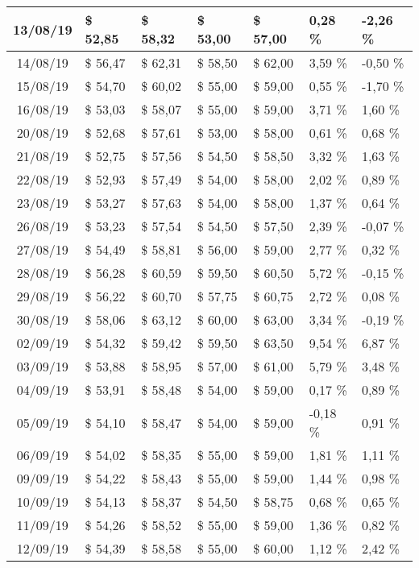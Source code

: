 \begin{center}
\begin{longtable}{|c|p{1.5cm}|p{1.5cm}|p{1.5cm}|p{1.5cm}|p{1.5cm}|p{1.5cm}|}
13/08/19 & \$ 52,85 & \$ 58,32 & \$ 53,00 & \$ 57,00 & 0,28 \% & -2,26 \% \\ \hline
14/08/19 & \$ 56,47 & \$ 62,31 & \$ 58,50 & \$ 62,00 & 3,59 \% & -0,50 \% \\ \hline
15/08/19 & \$ 54,70 & \$ 60,02 & \$ 55,00 & \$ 59,00 & 0,55 \% & -1,70 \% \\ \hline
16/08/19 & \$ 53,03 & \$ 58,07 & \$ 55,00 & \$ 59,00 & 3,71 \% & 1,60 \% \\ \hline
20/08/19 & \$ 52,68 & \$ 57,61 & \$ 53,00 & \$ 58,00 & 0,61 \% & 0,68 \% \\ \hline
21/08/19 & \$ 52,75 & \$ 57,56 & \$ 54,50 & \$ 58,50 & 3,32 \% & 1,63 \% \\ \hline
22/08/19 & \$ 52,93 & \$ 57,49 & \$ 54,00 & \$ 58,00 & 2,02 \% & 0,89 \% \\ \hline
23/08/19 & \$ 53,27 & \$ 57,63 & \$ 54,00 & \$ 58,00 & 1,37 \% & 0,64 \% \\ \hline
26/08/19 & \$ 53,23 & \$ 57,54 & \$ 54,50 & \$ 57,50 & 2,39 \% & -0,07 \% \\ \hline
27/08/19 & \$ 54,49 & \$ 58,81 & \$ 56,00 & \$ 59,00 & 2,77 \% & 0,32 \% \\ \hline
28/08/19 & \$ 56,28 & \$ 60,59 & \$ 59,50 & \$ 60,50 & 5,72 \% & -0,15 \% \\ \hline
29/08/19 & \$ 56,22 & \$ 60,70 & \$ 57,75 & \$ 60,75 & 2,72 \% & 0,08 \% \\ \hline
30/08/19 & \$ 58,06 & \$ 63,12 & \$ 60,00 & \$ 63,00 & 3,34 \% & -0,19 \% \\ \hline
02/09/19 & \$ 54,32 & \$ 59,42 & \$ 59,50 & \$ 63,50 & 9,54 \% & 6,87 \% \\ \hline
03/09/19 & \$ 53,88 & \$ 58,95 & \$ 57,00 & \$ 61,00 & 5,79 \% & 3,48 \% \\ \hline
04/09/19 & \$ 53,91 & \$ 58,48 & \$ 54,00 & \$ 59,00 & 0,17 \% & 0,89 \% \\ \hline
05/09/19 & \$ 54,10 & \$ 58,47 & \$ 54,00 & \$ 59,00 & -0,18 \% & 0,91 \% \\ \hline
06/09/19 & \$ 54,02 & \$ 58,35 & \$ 55,00 & \$ 59,00 & 1,81 \% & 1,11 \% \\ \hline
09/09/19 & \$ 54,22 & \$ 58,43 & \$ 55,00 & \$ 59,00 & 1,44 \% & 0,98 \% \\ \hline
10/09/19 & \$ 54,13 & \$ 58,37 & \$ 54,50 & \$ 58,75 & 0,68 \% & 0,65 \% \\ \hline
11/09/19 & \$ 54,26 & \$ 58,52 & \$ 55,00 & \$ 59,00 & 1,36 \% & 0,82 \% \\ \hline
12/09/19 & \$ 54,39 & \$ 58,58 & \$ 55,00 & \$ 60,00 & 1,12 \% & 2,42 \% \\ \hline

\end{longtable}
\end{center}

